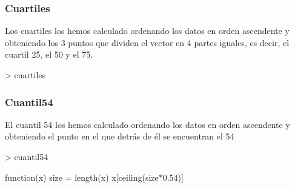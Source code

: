 \documentclass [a4paper] {article}
\begin{document}
\subsubsection{Cuartiles}
Los cuartiles los hemos calculado ordenando los datos en orden ascendente 
y obteniendo los 3 puntos que dividen el vector en 4 partes iguales, es decir, 
el cuartil 25, el 50 y el 75.
\begin{Schunk}
\begin{Sinput}
> cuartiles
\end{Sinput}
\end{Schunk}
\subsubsection{Cuantil54}
El cuantil 54 los hemos calculado ordenando los datos en orden ascendente 
y obteniendo el punto en el que detrás de él se encuentran el 54%
\begin{Schunk}
\begin{Sinput}
> cuantil54
\end{Sinput}
\begin{Soutput}
function(x){
  size = length(x)
  x[ceiling(size*0.54)]
}
\end{Soutput}
\end{Schunk}
\end{document}
